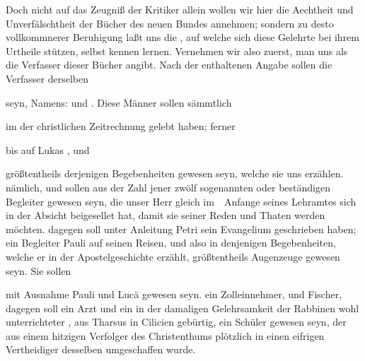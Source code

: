 Doch nicht auf das Zeugniß der Kritiker allein wollen wir hier die Aechtheit und Unverfälschtheit der Bücher des neuen Bundes annehmen; sondern zu desto vollkommnerer Beruhigung laßt uns die , auf welche sich diese Gelehrte bei ihrem Urtheile stützen, selbst kennen lernen. Vernehmen wir also zuerst,  man uns als die Verfasser dieser Bücher angibt. Nach der  enthaltenen Angabe sollen die Verfasser derselben
\begin{aufza}
\item {} seyn, Namens:  und . Diese Männer sollen sämmtlich
\item im  der christlichen Zeitrechnung gelebt haben; ferner
\item bis auf Lukas , und
\item größtentheils  derjenigen Begebenheiten gewesen seyn, welche sie uns erzählen.  nämlich,  und  sollen aus der Zahl jener zwölf sogenannten  oder beständigen Begleiter gewesen seyn, die unser Herr gleich im~\ Anfange seines Lehramtes sich in der Absicht beigesellet hat, damit sie  seiner Reden und Thaten werden möchten.  dagegen soll unter Anleitung Petri sein Evangelium geschrieben haben;  ein Begleiter Pauli auf seinen Reisen, und also in denjenigen Begebenheiten, welche er in der Apostelgeschichte erzählt, größtentheils Augenzeuge gewesen seyn. Sie sollen
\item mit Ausnahme Pauli und Lucä  gewesen seyn.  ein Zolleinnehmer,  und  Fischer,  dagegen soll ein Arzt und  ein in der damaligen Gelehrsamkeit der Rabbinen wohl unterrichteter , aus Tharsus in Cilicien gebürtig, ein Schüler  gewesen seyn, der aus einem hitzigen Verfolger des Christenthums plötzlich in einen eifrigen Vertheidiger desselben umgeschaffen wurde.
\end{aufza}

